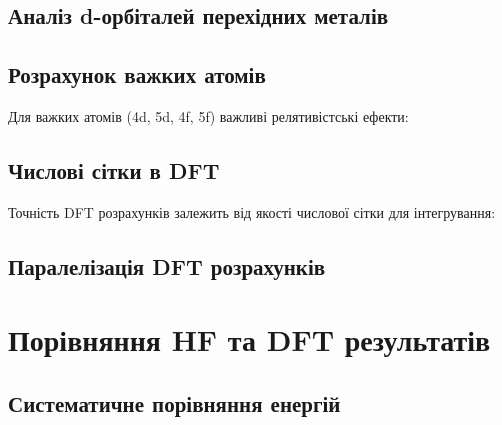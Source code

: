 \subsection{Аналіз d-орбіталей перехідних металів}



\subsection{Розрахунок важких атомів}

Для важких атомів (4d, 5d, 4f, 5f) важливі релятивістські ефекти:



\subsection{Числові сітки в DFT}

Точність DFT розрахунків залежить від якості числової сітки для інтегрування:


\subsection{Паралелізація DFT розрахунків}



\section{Порівняння HF та DFT результатів}


\subsection{Систематичне порівняння енергій}

